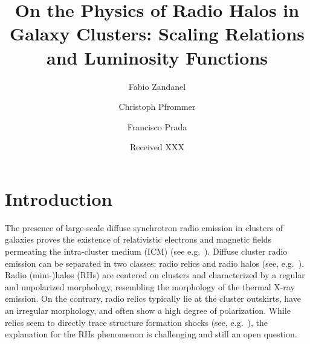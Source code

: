 \documentclass[traditabstract]{aa}
\begin{document}
\title{On the Physics of Radio Halos in Galaxy Clusters: Scaling Relations and Luminosity Functions}

\author{
 Fabio Zandanel \and
 Christoph Pfrommer \and
 Francisco Prada
}

\date{Received XXX}

\abstract{
}




\maketitle


\section{Introduction}
\label{sec:1}
The presence of large-scale diffuse synchrotron radio emission in clusters of
galaxies proves the existence of relativistic electrons and magnetic fields
permeating the intra-cluster medium (ICM) (see
e.g.~\citealp{2004NewAR..48.1137F}).
\begingroup
\let\thefootnote\relax{}
\endgroup
Diffuse cluster radio emission can be separated in two classes: radio relics and
radio halos (see, e.g.~\citealp{2004rcfg.procE..25K,2008SSRv..134...93F}).
Radio \mbox{(mini-)}halos (RHs) are centered on clusters and characterized by a
regular and unpolarized morphology, resembling the morphology of the thermal
X-ray emission. On the contrary, radio relics typically lie at the cluster
outskirts, have an irregular morphology, and often show a high degree of
polarization. While relics seem to directly trace structure formation shocks
(see, e.g.~\citealp{2011A&A...533A..35V}), the explanation for the RHs phenomenon
is challenging and still an open question.
                                   
\end{document}
